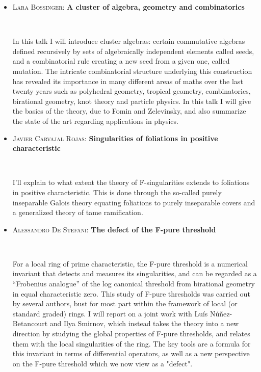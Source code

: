 \documentclass[12pt]{amsart}
\begin{document}
\begin{itemize}

\vfill

\item \textsc{Lara Bossinger:} \textbf{A cluster of algebra, geometry and combinatorics}

\

\noindent  In this talk I will introduce cluster algebras: certain commutative algebras defined recursively by sets of algebraically independent elements called seeds, and a combinatorial rule creating a new seed from a given one, called mutation. The intricate combinatorial structure underlying this construction has revealed its importance in many different areas of maths over the last twenty years such as polyhedral geometry, tropical geometry, combinatorics, birational geometry, knot theory and particle physics. In this talk I will give the basics of the theory, due to Fomin and Zelevinsky, and also summarize the state of the art regarding applications in physics.

\vfill

\item  \textsc{Javier Carvajal Rojas:}  \textbf{Singularities of foliations in positive characteristic}

\

\noindent  I'll explain to what extent the theory of F-singularities extends to foliations in positive characteristic. This is done through the so-called purely inseparable Galois theory equating foliations to purely inseparable covers and a generalized theory of tame ramification. 

\vfill

\item  \textsc{Alessandro De Stefani:} \textbf{The defect of the F-pure threshold}

\

\noindent  For a local ring of prime characteristic, the F-pure threshold is a numerical invariant that detects and measures its singularities, and can be regarded as a “Frobenius analogue” of the log canonical threshold from birational geometry in equal characteristic zero. This study of F-pure thresholds was carried out by several authors, bust for most part within the framework of local (or standard graded) rings. I will report on a joint work with Luís Núñez-Betancourt and Ilya Smirnov, which instead takes the theory into a new direction by studying the global properties of F-pure thresholds, and relates them with the local singularities of the ring. The key tools are a formula for this invariant in terms of differential operators, as well as a new perspective on the F-pure threshold which we now view as a "defect".


\end{itemize}
\end{document}
